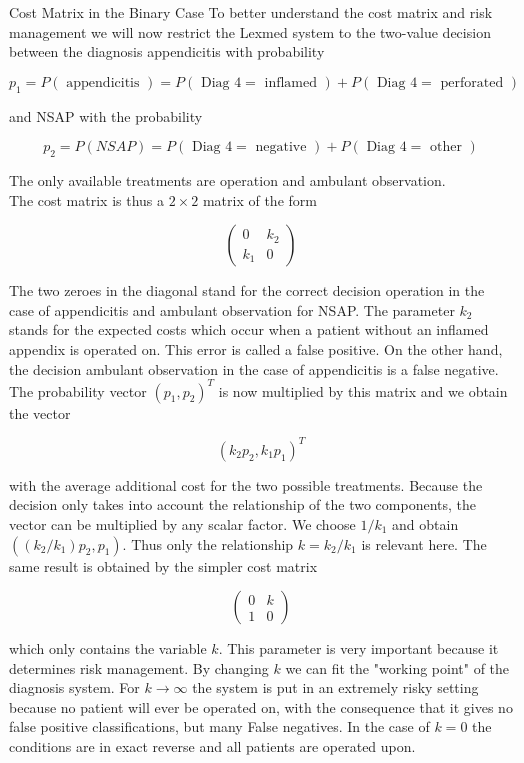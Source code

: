 \documentclass[10pt]{book}
\begin{document}
Cost Matrix in the Binary Case
To better understand the cost matrix and risk management we will now restrict the Lexmed system to the two-value decision between the diagnosis appendicitis with probability

$$
p_{1}=P(\text { appendicitis })=P(\text { Diag } 4=\text { inflamed })+P(\text { Diag } 4=\text { perforated })
$$

and NSAP with the probability

$$
p_{2}=P(N S A P)=P(\text { Diag } 4=\text { negative })+P(\text { Diag } 4=\text { other })
$$

The only available treatments are operation and ambulant observation.\\
The cost matrix is thus a $2 \times 2$ matrix of the form

$$
\left(\begin{array}{cc}
0 & k_{2} \\
k_{1} & 0
\end{array}\right)
$$

The two zeroes in the diagonal stand for the correct decision operation in the case of appendicitis and ambulant observation for NSAP. The parameter $k_{2}$ stands for the expected costs which occur when a patient without an inflamed appendix is operated on. This error is called a false positive. On the other hand, the decision ambulant observation in the case of appendicitis is a false negative. The probability vector $\left(p_{1}, p_{2}\right)^{T}$ is now multiplied by this matrix and we obtain the vector

$$
\left(k_{2} p_{2}, k_{1} p_{1}\right)^{T}
$$

with the average additional cost for the two possible treatments. Because the decision only takes into account the relationship of the two components, the vector can be multiplied by any scalar factor. We choose $1 / k_{1}$ and obtain $\left(\left(k_{2} / k_{1}\right) p_{2}, p_{1}\right)$. Thus only the relationship $k=k_{2} / k_{1}$ is relevant here. The same result is obtained by the simpler cost matrix

$$
\left(\begin{array}{ll}
0 & k \\
1 & 0
\end{array}\right)
$$

which only contains the variable $k$. This parameter is very important because it determines risk management. By changing $k$ we can fit the "working point" of the diagnosis system. For $k \rightarrow \infty$ the system is put in an extremely risky setting because no patient will ever be operated on, with the consequence that it gives no false positive classifications, but many False negatives. In the case of $k=0$ the conditions are in exact reverse and all patients are operated upon.
\end{document}
